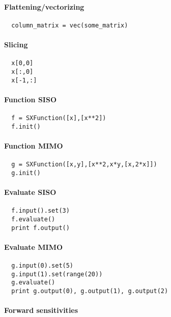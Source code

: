 \documentclass[a4paper,8pt,twocolumn]{article}
\begin{document}
\paragraph{Flattening/vectorizing}
\begin{verbatim}
  column_matrix = vec(some_matrix)
\end{verbatim}

\paragraph{Slicing}
\begin{verbatim}
  x[0,0]
  x[:,0]
  x[-1,:]
\end{verbatim}

\paragraph{Function SISO}

\begin{verbatim}
  f = SXFunction([x],[x**2])
  f.init()
\end{verbatim}

\paragraph{Function MIMO}
\begin{verbatim}
  g = SXFunction([x,y],[x**2,x*y,[x,2*x]])
  g.init()
\end{verbatim}

\paragraph{Evaluate SISO}

\begin{verbatim}
  f.input().set(3)
  f.evaluate()
  print f.output()
\end{verbatim}

\paragraph{Evaluate MIMO}
\begin{verbatim}
  g.input(0).set(5)
  g.input(1).set(range(20))
  g.evaluate()
  print g.output(0), g.output(1), g.output(2)
\end{verbatim}

\paragraph{Forward sensitivities}
\end{document}
